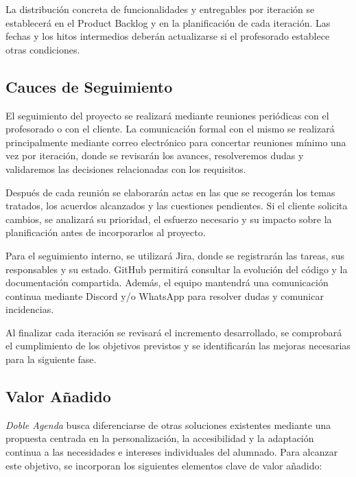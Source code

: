 La distribución concreta de funcionalidades y entregables por iteración se establecerá en el Product Backlog y en la planificación de cada iteración. Las fechas y los hitos intermedios deberán actualizarse si el profesorado establece otras condiciones.

\subsection{Cauces de Seguimiento}
El seguimiento del proyecto se realizará mediante reuniones periódicas con el profesorado o con el cliente. La comunicación formal con el mismo se realizará principalmente mediante correo electrónico para concertar reuniones mínimo una vez por iteración, donde se revisarán los avances, resolveremos dudas y validaremos las decisiones relacionadas con los requisitos.

Después de cada reunión se elaborarán actas en las que se recogerán los temas tratados, los acuerdos alcanzados y las cuestiones pendientes. Si el cliente solicita cambios, se analizará su prioridad, el esfuerzo necesario y su impacto sobre la planificación antes de incorporarlos al proyecto.

Para el seguimiento interno, se utilizará Jira, donde se registrarán las tareas, sus responsables y su estado. GitHub permitirá consultar la evolución del código y la documentación compartida. Además, el equipo mantendrá una comunicación continua mediante Discord y/o WhatsApp para resolver dudas y comunicar incidencias.

Al finalizar cada iteración se revisará el incremento desarrollado, se comprobará el cumplimiento de los objetivos previstos y se identificarán las mejoras necesarias para la siguiente fase.

\subsection{Valor Añadido}

\textit{Doble Agenda} busca diferenciarse de otras soluciones existentes mediante una propuesta centrada en la personalización, la accesibilidad y la adaptación continua a las necesidades e intereses individuales del alumnado. Para alcanzar este objetivo, se incorporan los siguientes elementos clave de valor añadido:

